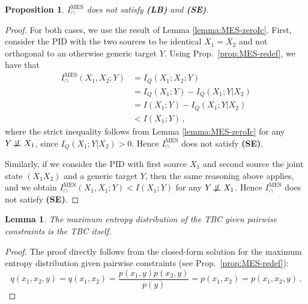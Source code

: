 \documentclass{article}
\newcommand{\notind}{\mathrel{\not\!\perp\!\!\!\perp}}
\newcommand{\LB}{\textbf{(LB)}\xspace} %
\newcommand{\SE}{\textbf{(SE)}\xspace} %
\newcommand{\IMES}{\ensuremath{I_\cap^{\text{MES}}}\xspace}
\newtheorem{lemma}{Lemma}
\newtheorem{proposition}{Proposition}
\begin{document}
\begin{proposition} \label{prop:MES-noSELB}
    $\IMES$ does not satisfy \LB and \SE.
\end{proposition}
\begin{proof}
    For both cases, we use the result of Lemma \ref{lemma:MES-zeroIc}.
    First, consider the PID with the two sources to be identical $X_1=X_2$ and not orthogonal to an otherwise generic target $Y$. Using Prop.~\ref{prop:MES-redef}, we have that
    \begin{equation}
        \begin{aligned}
            \IMES(X_1,X_2;Y) & = I_Q(X_1;X_2;Y) \\
            & = I_Q(X_1;Y) - I_Q(X_1;Y|X_2) \\
            & = I(X_1;Y) - I_Q(X_1;Y|X_2) \\
            & < I(X_1;Y) \,,
        \end{aligned}
    \end{equation}
    where the strict inequality follows from Lemma \ref{lemma:MES-zeroIc} for any $Y\notind X_1$, since $I_Q(X_1;Y|X_2)>0$. Hence $\IMES$ does not satisfy \SE.
    
    Similarly, if we consider the PID with first source $X_1$ and second source the joint state $(X_1 X_2)$ and a generic target $Y$, then the same reasoning above applies, and we obtain $\IMES(X_1,X_1;Y)< I(X_1;Y)$ for any $Y\notind X_1$. Hence $\IMES$ does not satisfy \SE.
\end{proof}


\begin{lemma} \label{lemma:MES_TBC}
    The maximum entropy distribution of the TBC given pairwise constraints is the TBC itself.
\end{lemma}
\begin{proof}
    The proof directly follows from the closed-form solution for the maximum entropy distribution given pairwise constraints (see Prop.~\ref{prop:MES-redef}):
    \begin{equation}
        q(x_1,x_2,y) = q(x_1,x_2) = \frac{p(x_1,y)p(x_2,y)}{p(y)} = p(x_1,x_2) = p(x_1,x_2,y) \,.
    \end{equation}
\end{proof}
\end{document}
